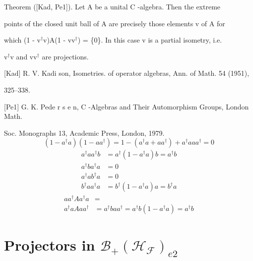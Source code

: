 \documentclass[aps,preprint]{revtex4}%
\begin{document}
\bigskip

Theorem ([Kad, Pe1]). Let A be a unital C -algebra. Then the extreme

points of the closed unit ball of A are precisely those elements v of A for

which (1 - v$^{\dagger}$v)A(1 - vv$^{\dagger}$) = \{0\}. In this case v is a
partial isometry, i.e.

v$^{\dagger}$v and vv$^{\dagger}$ are projections.

[Kad] R. V. Kadi son, Isometries. of operator algebras, Ann. of Math. 54 (1951),

325--338.

[Pe1] G. K. Pede r s e n, C -Algebras and Their Automorphism Groups, London Math.

Soc. Monographs 13, Academic Press, London, 1979.%
\begin{equation}
\left(  1-a^{\dagger}a\right)  \left(  1-aa^{\dagger}\right)  =1-\left(
a^{\dagger}a+aa^{\dagger}\right)  +a^{\dagger}aaa^{\dagger}=0
\end{equation}%
\begin{align}
a^{\dagger}aa^{\dagger}b  &  =a^{\dagger}\left(  1-a^{\dagger}a\right)
b=a^{\dagger}b\\
a^{\dagger}ba^{\dagger}a  &  =0\\
a^{\dagger}ab^{\dagger}a  &  =0\\
b^{\dagger}aa^{\dagger}a  &  =b^{\dagger}\left(  1-a^{\dagger}a\right)
a=b^{\dagger}a
\end{align}%
\begin{align}
aa^{\dagger}Aa^{\dagger}a  &  =\\
a^{\dagger}aAaa^{\dagger}  &  =a^{\dagger}baa^{\dagger}=a^{\dagger}b\left(
1-a^{\dagger}a\right)  =a^{\dagger}b
\end{align}


\section{Projectors in $\mathcal{B}_{+}\left(  \mathcal{H}_{\mathcal{F}%
}\right)  _{e2}$}
\end{document}
